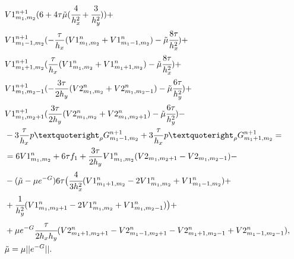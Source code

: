 \begin{align*}
& V1_{m_1,m_2}^{n+1}(6 + 4\tau \tilde{\mu}(\cfrac{4}{h_x^2} + \cfrac{3}{h_y^2})) +\\
& V1_{m_1-1,m_2}^{n+1}(-\frac{\tau}{h_x}(V1_{m_1,m_2}^n + V1_{m_1-1,m_2}^n) -\tilde{\mu}\cfrac{8\tau}{h_x^2}) +\\
& V1_{m_1+1,m_2}^{n+1}(\frac{\tau}{h_x}(V1_{m_1,m_2}^n + V1_{m_1+1,m_2}^n) -\tilde{\mu}\cfrac{8\tau}{h_x^2}) +\\
& V1_{m_1,m_2-1}^{n+1}(-\frac{3\tau}{2h_y}(V2_{m_1,m_2}^n + V2_{m_1,m_2-1}^n) -\tilde{\mu}\cfrac{6\tau}{h_y^2}) +\\
& V1_{m_1,m_2+1}^{n+1}(\frac{3\tau}{2h_y}(V2_{m_1,m_2}^n + V2_{m_1,m_2+1}^n) -\tilde{\mu}\cfrac{6\tau}{h_y^2}) -\\
& - 3\frac{\tau}{h_x} p’_{\rho} G_{m_1-1,m_2}^{n+1} + 3\frac{\tau}{h_x} p’_{\rho} G_{m_1+1,m_2}^{n+1} = \\
& =  6 V1_{m_1,m_2}^n + 6\tau f_1 + \frac{3\tau}{2h_y}V1_{m_1,m_2}^n (V2_{m_1,m_2+1}-V2_{m_1,m_2-1}) - \\
& - (\tilde{\mu} - \mu e^{-G}) 6 \tau 
  \big(\cfrac{4}{3h_x^2}(V1_{m_1+1,m_2}^n - 2V1_{m_1,m_2}^n + V1_{m_1-1,m_2}^n) +\\
&  +  \cfrac{1}{h_y^2}(V1_{m_1,m_2+1}^n - 2V1_{m_1,m_2}^n + V1_{m_1,m_2-1}^n)\big) +\\
& + \mu e^{-G} \cfrac{\tau}{2h_x h_y}
  (V2_{m_1+1,m_2+1}^n - V2_{m_1-1,m_2+1}^n - V2_{m_1+1,m_2-1}^n + V2_{m_1-1,m_2-1}^n), \\
& \tilde{\mu} = \mu || e^{-G} ||.
\end{align*}
